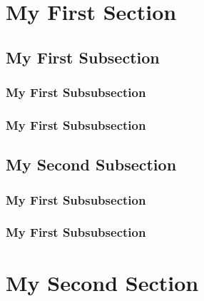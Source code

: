 \documentclass{article}
\begin{document}
  \section{My First Section}
  \label{sec:section 1}
  \subsection{My First Subsection}
  \label{sec:subsection 1.1}
  \subsubsection{My First Subsubsection}
  \label{sec:subsubsection 1.1.1}
  \subsubsection{My First Subsubsection}
  \label{sec:subsubsection 1.1.2}
  \subsection{My Second Subsection}
  \label{sec:subsection 1.2}
  \subsubsection{My First Subsubsection}
  \label{sec:subsubsection 1.2.1}
  \subsubsection{My First Subsubsection}
  \label{sec:subsubsection 1.2.2}
  \section{My Second Section}
  \label{sec:section 2}

  \label{sec  }
\end{document}
